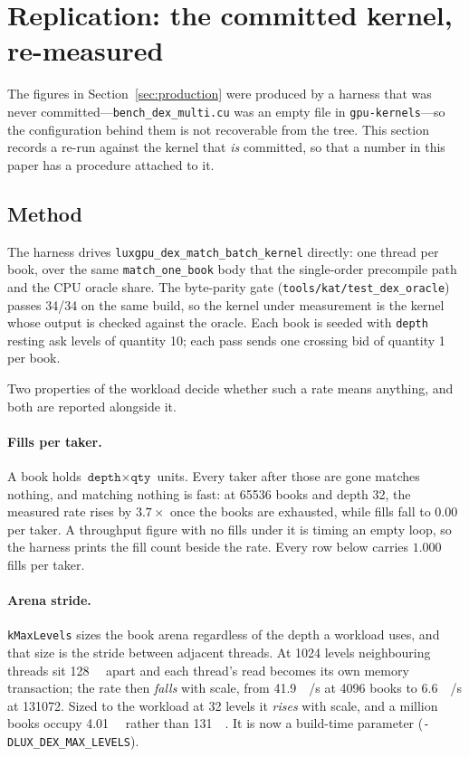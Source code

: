 \section{Replication: the committed kernel, re-measured}
\label{sec:replication}

The figures in Section~\ref{sec:production} were produced by a harness that was
never committed---\texttt{bench\_dex\_multi.cu} was an empty file in
\texttt{gpu-kernels}---so the configuration behind them is not recoverable from
the tree. This section records a re-run against the kernel that \emph{is}
committed, so that a number in this paper has a procedure attached to it.

\subsection{Method}

The harness drives \verb|luxgpu_dex_match_batch_kernel| directly: one thread per
book, over the same \verb|match_one_book| body that the single-order precompile
path and the CPU oracle share. The byte-parity gate
(\texttt{tools/kat/test\_dex\_oracle}) passes 34/34 on the same build, so the
kernel under measurement is the kernel whose output is checked against the
oracle. Each book is seeded with \texttt{depth} resting ask levels of quantity
10; each pass sends one crossing bid of quantity 1 per book.

Two properties of the workload decide whether such a rate means anything, and
both are reported alongside it.

\paragraph{Fills per taker.} A book holds $\texttt{depth} \times \texttt{qty}$
units. Every taker after those are gone matches nothing, and matching nothing is
fast: at \num{65536} books and depth 32, the measured rate rises by
$3.7\times$ once the books are exhausted, while fills fall to $0.00$ per taker.
A throughput figure with no fills under it is timing an empty loop, so the
harness prints the fill count beside the rate. Every row below carries
$1.000$ fills per taker.

\paragraph{Arena stride.} \verb|kMaxLevels| sizes the book arena regardless of
the depth a workload uses, and that size is the stride between adjacent threads.
At 1024 levels neighbouring threads sit \SI{128}{\kibi\byte} apart and each
thread's read becomes its own memory transaction; the rate then \emph{falls}
with scale, from \SI{41.9}{\mega{}/\second} at \num{4096} books to
\SI{6.6}{\mega{}/\second} at \num{131072}. Sized to the workload at 32
levels it \emph{rises} with scale, and a million books occupy
\SI{4.01}{\gibi\byte} rather than \SI{131}{\gibi\byte}. It is now a build-time
parameter (\verb|-DLUX_DEX_MAX_LEVELS|).

